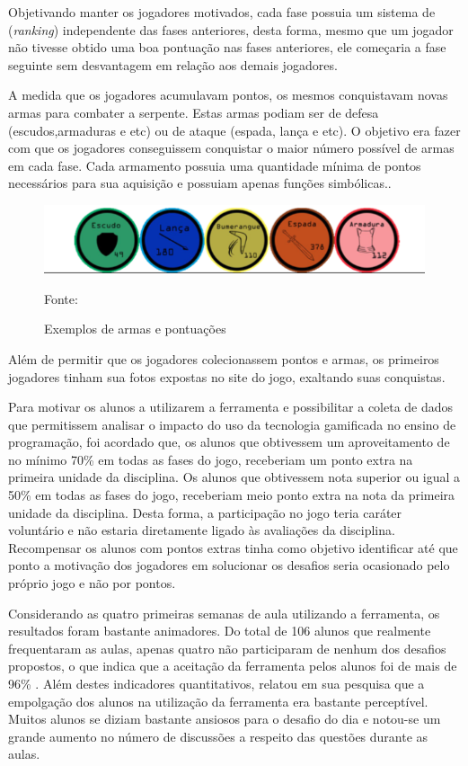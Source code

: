 Objetivando manter os jogadores motivados, cada fase possuia um sistema de (\textit{ranking}{\itshape}) independente
das fases anteriores, desta forma, mesmo que um jogador não tivesse obtido uma boa pontuação nas fases anteriores, ele
começaria a fase seguinte sem desvantagem em relação aos demais jogadores. 

A medida que os jogadores acumulavam pontos, os mesmos conquistavam novas armas para combater a serpente. Estas armas podiam
ser de defesa (escudos,armaduras e etc) ou de ataque (espada, lança e etc). O objetivo era fazer com que os jogadores conseguissem conquistar
o maior número possível de armas em cada fase. Cada armamento possuia uma quantidade mínima de pontos necessários para sua
aquisição e possuiam apenas funções simbólicas..

\begin{figure}[h]
	\centering
	\includegraphics[keepaspectratio=true,scale=0.45]{figuras/armas.png}
	\caption{Exemplos de armas e pontuações}
	Fonte: \cite{raposo2016desafio}
	\label{figura2}
\end{figure}

Além de permitir que os jogadores colecionassem pontos e armas, os primeiros jogadores tinham sua fotos expostas no
site do jogo, exaltando suas conquistas.

Para motivar os alunos a utilizarem a ferramenta e possibilitar a coleta de dados que permitissem analisar o 
impacto do uso da tecnologia gamificada no ensino de programação, foi acordado que, os alunos que obtivessem 
um aproveitamento de no mínimo 70\% em todas as fases do jogo, receberiam um ponto extra na primeira unidade 
da disciplina. Os alunos que obtivessem nota superior ou igual a 50\% em todas as fases do jogo, receberiam 
meio ponto extra na nota da primeira unidade da disciplina. Desta forma, a participação no jogo teria caráter 
voluntário e não estaria diretamente ligado às avaliações da disciplina. Recompensar os alunos com pontos extras
tinha como objetivo identificar até que ponto a motivação dos jogadores em solucionar os desafios seria ocasionado
pelo próprio jogo e não por pontos.

Considerando as quatro primeiras semanas de aula utilizando a ferramenta, os resultados foram bastante animadores.
Do total de 106 alunos que realmente frequentaram as aulas, apenas quatro não participaram de nenhum dos desafios 
propostos, o que indica que a aceitação da ferramenta pelos alunos foi de mais de 96\% . Além destes indicadores 
quantitativos,  relatou em sua pesquisa que a empolgação dos alunos na utilização da 
ferramenta era bastante perceptível. Muitos alunos se diziam bastante ansiosos para o desafio do dia e notou-se um 
grande aumento no número de discussões a respeito das questões durante as aulas.

